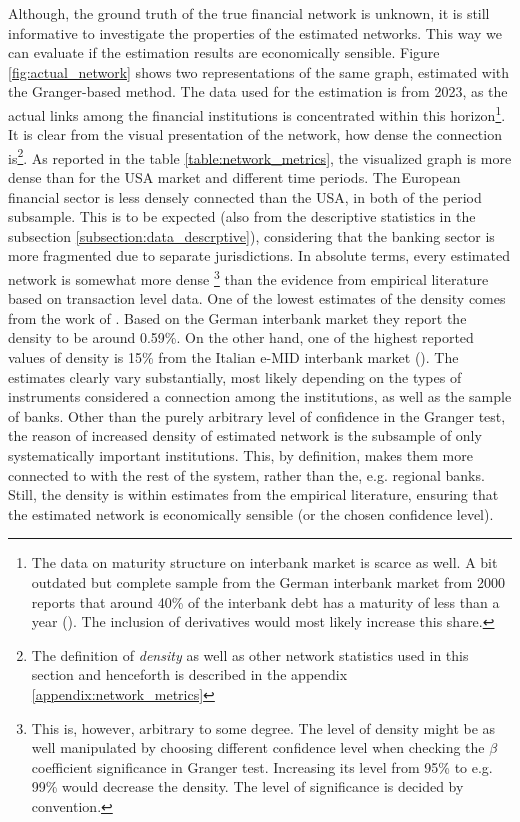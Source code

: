 \documentclass[12pt]{article}
\begin{document}
Although, the ground truth of the true financial network is unknown, it is still informative to investigate the properties of the estimated networks. This way we can evaluate if the estimation results are economically sensible. Figure \ref{fig:actual_network} shows two representations of the same graph, estimated with the Granger-based method. The data used for the estimation is from 2023, as the actual links among the financial institutions is concentrated within this horizon\footnote{The data on maturity structure on interbank market is scarce as well. A bit outdated but complete sample from the German interbank market from 2000 reports that around 40\% of the interbank debt has a maturity of less than a year (\cite{upper04}). The inclusion of derivatives would most likely increase this share.}. It is clear from the visual presentation of the network, how dense the connection is\footnote{The definition of \textit{density} as well as other network statistics used in this section and henceforth is described in the appendix \ref{appendix:network_metrics}}. As reported in the table \ref{table:network_metrics}, the visualized graph is more dense than for the USA market and different time periods. The European financial sector is less densely connected than the USA, in both of the period subsample. This is to be expected (also from the descriptive statistics in the subsection \ref{subsection:data_descrptive}), considering that the banking sector is more fragmented due to separate jurisdictions. In absolute terms, every estimated network is somewhat more dense \footnote{This is, however, arbitrary to some degree. The level of density might be as well manipulated by choosing different confidence level when checking the $\beta$ coefficient significance in Granger test. Increasing its level from 95\% to e.g. 99\% would decrease the density. The level of significance is decided by convention.} than the evidence from empirical literature based on transaction level data.  One of the lowest estimates of the density comes from the work of \cite{anand15}. Based on the German interbank market they report the density to be around 0.59\%. On the other hand, one of the highest reported values of density is 15\% from the Italian e-MID interbank market (\cite{fricke15}). The estimates clearly vary substantially, most likely depending on the types of instruments considered a connection among the institutions, as well as the sample of banks. Other than the purely arbitrary level of confidence in the Granger test, the reason of increased density of estimated network is the subsample of only systematically important institutions. This, by definition, makes them more connected to with the rest of the system, rather than the, e.g. regional banks. Still, the density is within estimates from the empirical literature, ensuring that the estimated network is economically sensible (or the chosen confidence level).
\end{document}
